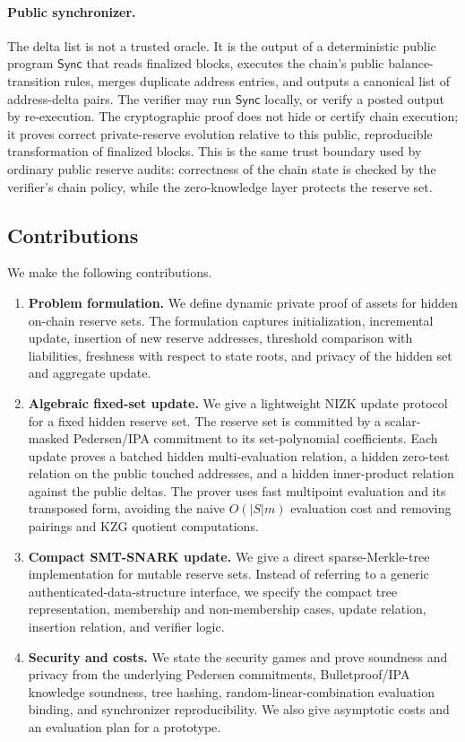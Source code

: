 \documentclass[runningheads]{llncs}
\newcommand{\Sync}{\mathsf{Sync}}
\begin{document}
\paragraph{Public synchronizer.}
The delta list is not a trusted oracle.  It is the output of a deterministic public program \(\Sync\) that reads finalized blocks, executes the chain's public balance-transition rules, merges duplicate address entries, and outputs a canonical list of address-delta pairs.  The verifier may run \(\Sync\) locally, or verify a posted output by re-execution.  The cryptographic proof does not hide or certify chain execution; it proves correct private-reserve evolution relative to this public, reproducible transformation of finalized blocks.  This is the same trust boundary used by ordinary public reserve audits: correctness of the chain state is checked by the verifier's chain policy, while the zero-knowledge layer protects the reserve set.

\subsection{Contributions}

We make the following contributions.

\begin{enumerate}[leftmargin=2em]
    \item \textbf{Problem formulation.} We define dynamic private proof of assets for hidden on-chain reserve sets.  The formulation captures initialization, incremental update, insertion of new reserve addresses, threshold comparison with liabilities, freshness with respect to state roots, and privacy of the hidden set and aggregate update.
    \item \textbf{Algebraic fixed-set update.} We give a lightweight NIZK update protocol for a fixed hidden reserve set.  The reserve set is committed by a scalar-masked Pedersen/IPA commitment to its set-polynomial coefficients.  Each update proves a batched hidden multi-evaluation relation, a hidden zero-test relation on the public touched addresses, and a hidden inner-product relation against the public deltas.  The prover uses fast multipoint evaluation and its transposed form, avoiding the naive \(O(|S|m)\) evaluation cost and removing pairings and KZG quotient computations.
    \item \textbf{Compact SMT-SNARK update.} We give a direct sparse-Merkle-tree implementation for mutable reserve sets.  Instead of referring to a generic authenticated-data-structure interface, we specify the compact tree representation, membership and non-membership cases, update relation, insertion relation, and verifier logic.
    \item \textbf{Security and costs.} We state the security games and prove soundness and privacy from the underlying Pedersen commitments, Bulletproof/IPA knowledge soundness, tree hashing, random-linear-combination evaluation binding, and synchronizer reproducibility.  We also give asymptotic costs and an evaluation plan for a prototype.
\end{enumerate}
\end{document}
